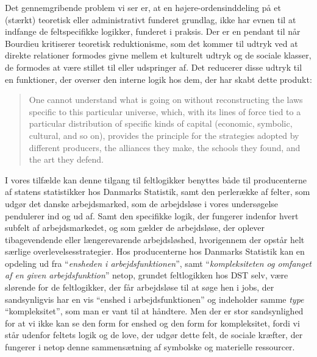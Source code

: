 Det gennemgribende problem vi ser er, at en højere-ordensinddeling på et (stærkt) teoretisk eller administrativt funderet grundlag, ikke har evnen til at indfange de feltspecifikke logikker, funderet i praksis. Der er en pendant til når Bourdieu kritiserer  teoretisk reduktionisme, som det kommer til udtryk ved at direkte relationer formodes givne mellem et kulturelt udtryk og de sociale klasser, de formodes at være stillet til eller udspringer af. Det reducerer disse udtryk til en funktioner, der overser den interne logik hos dem, der har skabt dette produkt:
%
\begin{quote} \small %
One cannot understand what is going on without reconstructing the laws specific to this particular universe, which, with its lines of force tied to a particular distribution of specific kinds of capital (economic, symbolic, cultural, and so on), provides the principle for the strategies adopted by different producers, the alliances they make, the schools they found, and the art they defend. 
\end{quote}
%
I vores tilfælde kan denne tilgang til feltlogikker benyttes både til producenterne af statens statistikker hos Danmarks Statistik, samt den perlerække af felter, som udgør det danske arbejdsmarked, som de arbejdsløse i vores undersøgelse pendulerer ind og ud af. Samt den specifikke logik, der fungerer indenfor hvert subfelt af arbejdsmarkedet, og som gælder de arbejdsløse, der oplever tibagevendende eller længerevarende arbejdsløshed, hvorigennem der opstår helt særlige overlevelsesstrategier. Hos producenterne hos Danmarks Statistik kan en opdeling ud fra “\emph{ensheden i arbejdsfunktionen}”, samt “\emph{kompleksiteten og omfanget af en given arbejdsfunktion}” netop, grundet feltlogikken hos DST selv, være slørende for de feltlogikker, der får arbejdsløse til at søge hen i jobs, der sandsynligvis har en vis “enshed i arbejdsfunktionen” og indeholder samme \emph{type} “kompleksitet”, som man er vant til at håndtere. Men der er stor sandsynlighed for at vi ikke kan se den form for enshed og den form for kompleksitet, fordi vi står udenfor feltets logik og de love, der udgør dette felt, de sociale kræfter, der fungerer i netop denne sammensætning af symbolske og materielle ressourcer. 

